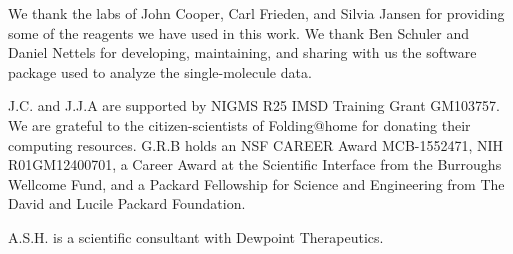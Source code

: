 \documentclass[../main.tex]{subfiles}
\begin{document}
        We thank the labs of John Cooper, Carl Frieden, and Silvia Jansen for providing some of the reagents we have used in this work. We thank Ben Schuler and Daniel Nettels for developing, maintaining, and sharing with us the software package used to analyze the single-molecule data.

        J.C. and J.J.A are supported by NIGMS R25 IMSD Training Grant GM103757. We are grateful to the citizen-scientists of Folding@home for donating their computing resources. G.R.B holds an NSF CAREER Award MCB-1552471, NIH R01GM12400701, a Career Award at the Scientific Interface from the Burroughs Wellcome Fund, and a Packard Fellowship for Science and Engineering from The David and Lucile Packard Foundation. \cite{}

        A.S.H. is a scientific consultant with Dewpoint Therapeutics.
% 
% 
% 
\end{document}
